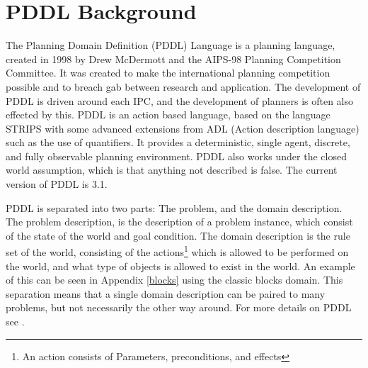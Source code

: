 \section{PDDL Background}
The Planning Domain Definition (PDDL) Language is a planning language, created in 1998 by Drew McDermott and the AIPS-98 Planning Competition Committee. It was created to make the international planning competition possible and to breach gab between research and application. The development of PDDL is driven around each IPC, and the development of planners is often also effected by this.
PDDL is an action based language, based on the language STRIPS with some advanced extensions from ADL (Action description language) such as the use of quantifiers. It provides a deterministic, single agent, discrete, and fully observable planning environment. PDDL also works under the closed world assumption, which is that anything not described is false. The current version of PDDL is 3.1.


PDDL is separated into two parts: The problem, and the domain description. The problem description, is the description of a problem instance, which consist of the state of the world and goal condition. The domain description is the rule set of the world, consisting of the actions\footnote{An action consists of Parameters, preconditions, and effects} which is allowed to be performed on the world, and what type of objects is allowed to exist in the world. An example of this can be seen in Appendix \ref{blocks} using the classic blocks domain. This separation means that a single domain description can be paired to many problems, but not necessarily the other way around. For more details on PDDL see \cite{kovacs2011bnf}.
